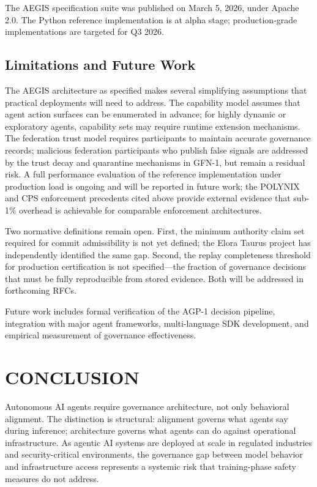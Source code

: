 \documentclass{IEEEcsmag}
\begin{document}
The AEGIS specification suite was published on March 5, 2026, under Apache 2.0. The Python reference implementation is at alpha stage; production-grade implementations are targeted for Q3 2026.

\subsection{Limitations and Future Work}

The AEGIS architecture as specified makes several simplifying assumptions that practical deployments will need to address. The capability model assumes that agent action surfaces can be enumerated in advance; for highly dynamic or exploratory agents, capability sets may require runtime extension mechanisms. The federation trust model requires participants to maintain accurate governance records; malicious federation participants who publish false signals are addressed by the trust decay and quarantine mechanisms in GFN-1, but remain a residual risk. A full performance evaluation of the reference implementation under production load is ongoing and will be reported in future work; the POLYNIX and CPS enforcement precedents cited above provide external evidence that sub-1\% overhead is achievable for comparable enforcement architectures.

Two normative definitions remain open. First, the minimum authority claim set required for commit admissibility is not yet defined; the Elora Taurus project has independently identified the same gap. Second, the replay completeness threshold for production certification is not specified---the fraction of governance decisions that must be fully reproducible from stored evidence. Both will be addressed in forthcoming RFCs.

Future work includes formal verification of the AGP-1 decision pipeline, integration with major agent frameworks, multi-language SDK development, and empirical measurement of governance effectiveness.

\section{CONCLUSION}

Autonomous AI agents require governance architecture, not only behavioral alignment. The distinction is structural: alignment governs what agents say during inference; architecture governs what agents can do against operational infrastructure. As agentic AI systems are deployed at scale in regulated industries and security-critical environments, the governance gap between model behavior and infrastructure access represents a systemic risk that training-phase safety measures do not address.
\end{document}
